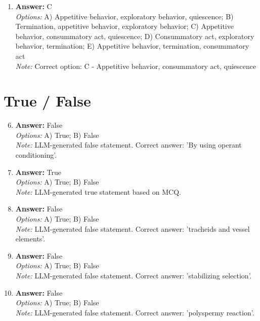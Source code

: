 \documentclass[12pt]{article}
\begin{document}
\begin{enumerate}[label=\arabic*.]
\\ \textit{Note:} Correct option: A - Plants, animals, and fungi all have both chloroplasts and mitochondria.
\item \textbf{Answer:} C
\\ \textit{Options:} A) Appetitive behavior, exploratory behavior, quiescence; B) Termination, appetitive behavior, exploratory behavior; C) Appetitive behavior, consummatory act, quiescence; D) Consummatory act, exploratory behavior, termination; E) Appetitive behavior, termination, consummatory act
\\ \textit{Note:} Correct option: C - Appetitive behavior, consummatory act, quiescence
\end{enumerate}

\section*{True / False}
\begin{enumerate}[label=\arabic*.]
\setcounter{enumi}{5}
\item \textbf{Answer:} False
\\ \textit{Options:} A) True; B) False
\\ \textit{Note:} LLM-generated false statement. Correct answer: 'By using operant conditioning'.
\item \textbf{Answer:} True
\\ \textit{Options:} A) True; B) False
\\ \textit{Note:} LLM-generated true statement based on MCQ.
\item \textbf{Answer:} False
\\ \textit{Options:} A) True; B) False
\\ \textit{Note:} LLM-generated false statement. Correct answer: 'tracheids and vessel elements'.
\item \textbf{Answer:} False
\\ \textit{Options:} A) True; B) False
\\ \textit{Note:} LLM-generated false statement. Correct answer: 'stabilizing selection'.
\item \textbf{Answer:} False
\\ \textit{Options:} A) True; B) False
\\ \textit{Note:} LLM-generated false statement. Correct answer: 'polyspermy reaction'.
\end{enumerate}
\end{document}
